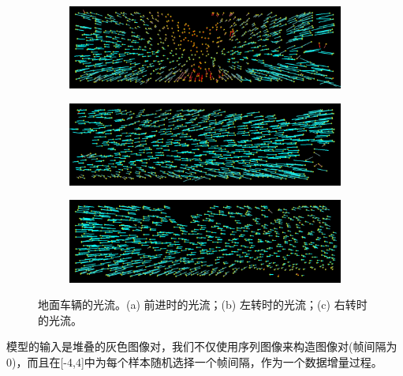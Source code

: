 \begin{figure}[ht]
    \centering
    \begin{subfigure}[b]{0.45\textwidth}
        \includegraphics[width=\textwidth]{datavo/flow_61.png}
        \caption{}
        \label{fig:optical_flow_f} 
        \vspace{4pt}
    \end{subfigure}
    \begin{subfigure}[b]{0.45\textwidth}
        \includegraphics[width=\textwidth]{datavo/flow_196.png}
        \caption{}
        \label{fig:optical_flow_l} 
        \vspace{4pt}
    \end{subfigure}
    \begin{subfigure}[b]{0.45\textwidth}
        \includegraphics[width=\textwidth]{datavo/flow_96.png}
        \caption{}
        \label{fig:optical_flow_r} 
    \end{subfigure}
    \caption{地面车辆的光流。(a) 前进时的光流；(b) 左转时的光流；(c) 右转时的光流。}    
    \label{fig:optical_flow}
\end{figure}

模型的输入是堆叠的灰色图像对，我们不仅使用序列图像来构造图像对{(帧间隔为0)}，而且在{[-4,4]}中为每个样本随机选择一个{帧间隔}，作为一个数据{增量}过程。 

